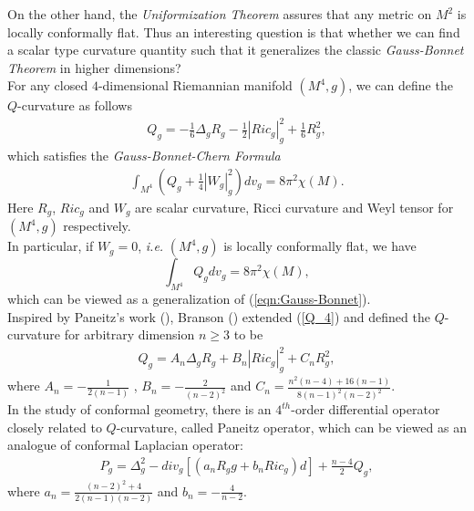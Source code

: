 \documentclass[12pt]{amsart}
\theoremstyle{definition}
\theoremstyle{remark}
\numberwithin{equation}{section}
\begin{document}
On the other hand, the \emph{Uniformization Theorem} assures that any metric on $M^2$ is locally conformally flat. Thus an interesting question is that whether we can find a scalar type curvature quantity such that it generalizes the classic \emph{Gauss-Bonnet Theorem} in higher dimensions? \\

For any closed $4$-dimensional Riemannian manifold $(M^4, g)$, we can define the $Q$-curvature as follows
\begin{align}\label{Q_4}
Q_g = - \frac{1}{6} \Delta_g R_g - \frac{1}{2} |Ric_g|_{g}^2 + \frac{1}{6} R_g^2,
\end{align}
which satisfies the \emph{Gauss-Bonnet-Chern Formula} 
\begin{align}\label{Gauss_Bonnet_Chern}
\int_{M^4} \left( Q_g + \frac{1}{4} |W_g|^2_g \right) dv_g = 8\pi^2 \chi(M).
\end{align}
Here $R_g$, $Ric_g$ and $W_g$ are scalar curvature, Ricci curvature and Weyl tensor for $(M^4, g)$ respectively.\\

In particular, if $W_g = 0$, \emph{i.e.} $(M^4, g)$ is locally conformally flat, we have 
\begin{equation}\label{total_Q}
\int_{M^4} Q_g dv_g = 8\pi^2 \chi(M),
\end{equation}
which can be viewed as a generalization of (\ref{eqn:Gauss-Bonnet}).\\

Inspired by Paneitz's work (\cite{Paneitz}), Branson (\cite{Branson}) extended (\ref{Q_4}) and defined the $Q$-curvature for arbitrary dimension $n \geq 3$ to be 
\begin{align}
Q_{g} = A_n \Delta_{g} R_{g} + B_n |Ric_{g}|_{g}^2 + C_nR_{g}^2,
\end{align}
where $A_n = - \frac{1}{2(n-1)}$ , $B_n = - \frac{2}{(n-2)^2}$ and
$C_n = \frac{n^2(n-4) + 16 (n-1)}{8(n-1)^2(n-2)^2}$.\\

In the study of conformal geometry, there is an $4^{th}$-order differential operator closely related to $Q$-curvature, called Paneitz operator, which can be viewed as an analogue of conformal Laplacian operator:
\begin{align}
P_g = \Delta_g^2 - div_g \left[(a_n R_g g + b_n Ric_g) d\right] + \frac{n-4}{2}Q_g,
\end{align}
where $a_n = \frac{(n-2)^2 + 4}{2(n-1)(n-2)}$ and $b_n = - \frac{4}{n-2}$.\\
\end{document}
